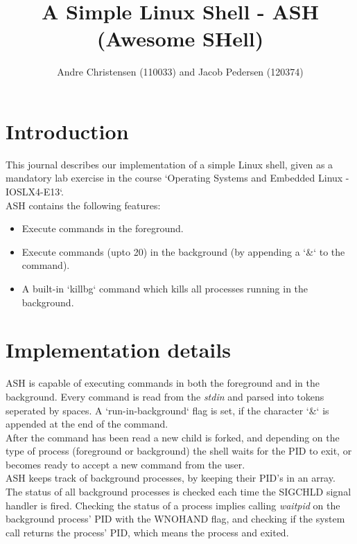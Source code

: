 \documentclass[pdftex, a4paper,12pt]{article}
\title{A Simple Linux Shell - ASH (Awesome SHell)}
\author{Andre Christensen (110033) and Jacob Pedersen (120374)}
\begin{document}
\maketitle
\newpage

\tableofcontents
\newpage

\section{Introduction}

This journal describes our implementation of a simple Linux shell, given as a mandatory lab exercise in the course `Operating Systems and Embedded Linux - IOSLX4-E13`.\\

ASH contains the following features:

\begin{itemize}
	\item Execute commands in the foreground.
	\item Execute commands (upto 20) in the background (by appending a `\&` to the command).
	\item A built-in `killbg` command which kills all processes running in the background.
\end{itemize}



\section{Implementation details}

ASH is capable of executing commands in both the foreground and in the background. Every command is read from the \emph{stdin} and parsed into tokens seperated by spaces. A `run-in-background` flag is set, if the character `\&` is appended at the end of the command.\\

After the command has been read a new child is forked, and depending on the type of process (foreground or background) the shell waits for the PID to exit, or becomes ready to accept a new command from the user.\\

ASH keeps track of background processes, by keeping their PID's in an array. The status of all background processes is checked each time the SIGCHLD signal handler is fired. Checking the status of a process implies calling \emph{waitpid} on the background process' PID with the WNOHAND flag, and checking if the system call returns the process' PID, which means the process and exited.
\end{document}
